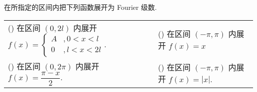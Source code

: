 \begin{example}
    在所指定的区间内把下列函数展开为 Fourier 级数.
    \setcounter{magicrownumbers}{0}
    \begin{table}[H]
        \centering
        \begin{tabular}{l | l}
            (\rownumber{}) 在区间 $(0,2l)$ 内展开 $f(x)=\begin{cases}A &,0<x<l \\0 & ,l<x<2l\end{cases}$. & (\rownumber{}) 在区间 $(-\pi,\pi)$ 内展开 $f(x)=x$    \\
            (\rownumber{}) 在区间 $(0,2\pi)$ 内展开 $f(x)=\dfrac{\pi-x}{2}.$                              & (\rownumber{}) 在区间 $(-\pi,\pi)$ 内展开 $f(x)=|x|.$ \\
        \end{tabular}
    \end{table}
\end{example}
